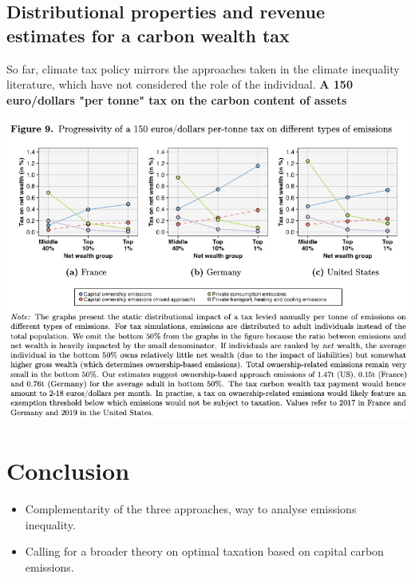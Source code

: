 \documentclass[10pt]{beamer}
\begin{document}
\subsection{Distributional properties and revenue estimates for a carbon wealth tax}
\begin{frame}{\subsecname}
    So far, climate tax policy mirrors the approaches taken in the climate inequality literature, which have not considered the role of the individual.
    \textbf{A 150 euro/dollars "per tonne" tax on the carbon content of assets}
    \begin{center}
        \includegraphics[width=1\textwidth]{../Figures/Figure_9.png}
    \end{center}
\end{frame}


\section{Conclusion}
\begin{frame}{\secname}
    \begin{itemize}
        \item Complementarity of the three approaches, way to analyse emissions inequality.
        \item Calling for a broader theory on optimal taxation based on capital carbon emissions. 
    \end{itemize}
\end{frame}
\end{document}
